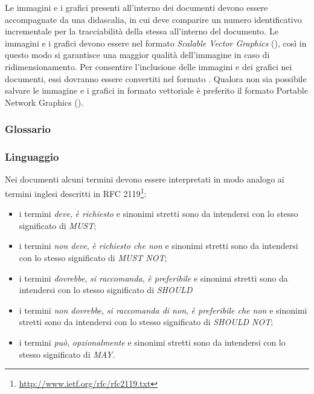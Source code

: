 \documentclass[12pt,a4paper]{article}
\begin{document}
Le immagini e i grafici presenti all'interno dei documenti devono essere accompagnate da una didascalia, in cui deve comparire un numero identificativo incrementale per la tracciabilità della stessa all'interno del documento. Le immagini e i grafici devono essere nel formato \emph{Scalable Vector Graphics} (), così in questo modo si garantisce una maggior qualità dell'immagine in caso di ridimensionamento. Per consentire l'inclusione delle immagini e dei grafici nei documenti, essi dovranno essere convertiti nel formato  . Qualora non sia possibile salvare le immagine e i grafici in formato vettoriale è preferito il formato Portable Network Graphics ().

\subsubsection{Glossario}
\TODO{}

\subsubsection{Linguaggio}
Nei documenti alcuni termini devono essere interpretati in modo analogo ai termini inglesi descritti in RFC 2119\footnote{\url{http://www.ietf.org/rfc/rfc2119.txt}}:
\begin{itemize}
	\item i termini \emph{deve}, \emph{è richiesto} e sinonimi stretti sono da intendersi con lo stesso significato di \emph{MUST};
	\item i termini \emph{non deve}, \emph{è richiesto che non} e sinonimi stretti sono da intendersi con lo stesso significato di \emph{MUST NOT};
	\item i  termini \emph{dovrebbe}, \emph{si raccomanda}, \emph{è preferibile} e sinonimi stretti sono da intendersi con lo stesso significato di \emph{SHOULD}
	\item i termini \emph{non dovrebbe}, \emph{si raccomanda di non}, \emph{è preferibile che non} e sinonimi stretti sono da intendersi con lo stesso significato di \emph{SHOULD NOT};
	\item i termini \emph{può}, \emph{opzionalmente} e sinonimi stretti sono da intendersi con lo stesso significato di \emph{MAY}.
\end{itemize}
\end{document}
